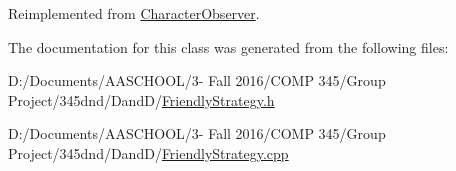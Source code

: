 Reimplemented from \hyperlink{class_character_observer_a398d6d784065c7ed36c928d44a574630}{Character\+Observer}.



The documentation for this class was generated from the following files\+:\begin{DoxyCompactItemize}
\item 
D\+:/\+Documents/\+A\+A\+S\+C\+H\+O\+O\+L/3-\/ Fall 2016/\+C\+O\+M\+P 345/\+Group Project/345dnd/\+Dand\+D/\hyperlink{_friendly_strategy_8h}{Friendly\+Strategy.\+h}\item 
D\+:/\+Documents/\+A\+A\+S\+C\+H\+O\+O\+L/3-\/ Fall 2016/\+C\+O\+M\+P 345/\+Group Project/345dnd/\+Dand\+D/\hyperlink{_friendly_strategy_8cpp}{Friendly\+Strategy.\+cpp}\end{DoxyCompactItemize}
